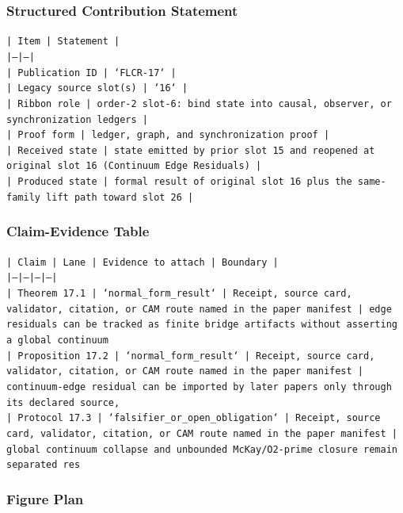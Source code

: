 \documentclass[11pt]{article}
\begin{document}
\subsubsection*{Structured Contribution Statement}

\noindent\texttt{| Item | Statement |}\\
\noindent\texttt{|---|---|}\\
\noindent\texttt{| Publication ID | `FLCR-17` |}\\
\noindent\texttt{| Legacy source slot(s) | `16` |}\\
\noindent\texttt{| Ribbon role | order-2 slot-6: bind state into causal, observer, or synchronization ledgers |}\\
\noindent\texttt{| Proof form | ledger, graph, and synchronization proof |}\\
\noindent\texttt{| Received state | state emitted by prior slot 15 and reopened at original slot 16 (Continuum Edge Residuals) |}\\
\noindent\texttt{| Produced state | formal result of original slot 16 plus the same-family lift path toward slot 26 |}\\

\subsubsection*{Claim-Evidence Table}

\noindent\texttt{| Claim | Lane | Evidence to attach | Boundary |}\\
\noindent\texttt{|---|---|---|---|}\\
\noindent\texttt{| Theorem 17.1 | `normal\_form\_result` | Receipt, source card, validator, citation, or CAM route named in the paper manifest | edge residuals can be tracked as finite bridge artifacts without asserting a global continuum }\\
\noindent\texttt{| Proposition 17.2 | `normal\_form\_result` | Receipt, source card, validator, citation, or CAM route named in the paper manifest | continuum-edge residual can be imported by later papers only through its declared source, }\\
\noindent\texttt{| Protocol 17.3 | `falsifier\_or\_open\_obligation` | Receipt, source card, validator, citation, or CAM route named in the paper manifest | global continuum collapse and unbounded McKay/O2-prime closure remain separated res}\\

\subsubsection*{Figure Plan}
\end{document}
